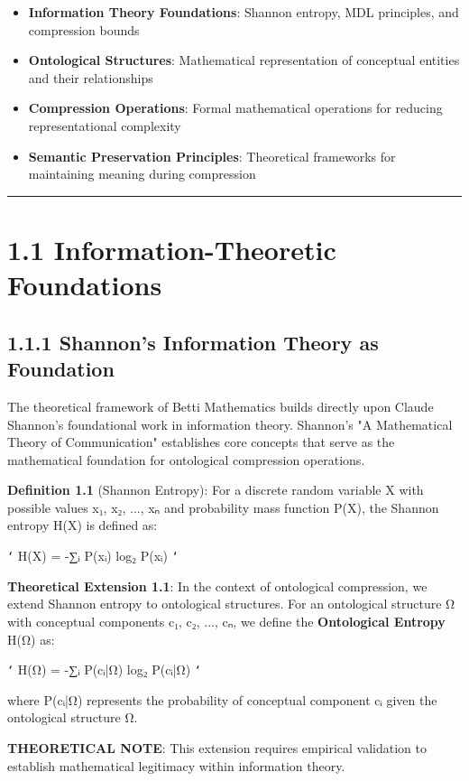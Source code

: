 \begin{itemize}
\item \textbf{Information Theory Foundations}: Shannon entropy, MDL principles, and compression bounds
\item \textbf{Ontological Structures}: Mathematical representation of conceptual entities and their relationships
\item \textbf{Compression Operations}: Formal mathematical operations for reducing representational complexity
\item \textbf{Semantic Preservation Principles}: Theoretical frameworks for maintaining meaning during compression
\end{itemize}

\hrule

\section{1.1 Information-Theoretic Foundations}

\subsection{1.1.1 Shannon's Information Theory as Foundation}

The theoretical framework of Betti Mathematics builds directly upon Claude Shannon's foundational work in information theory. Shannon's "A Mathematical Theory of Communication" establishes core concepts that serve as the mathematical foundation for ontological compression operations.

\textbf{Definition 1.1} (Shannon Entropy): For a discrete random variable X with possible values {x₁, x₂, ..., xₙ} and probability mass function P(X), the Shannon entropy H(X) is defined as:

\texttt{`}
H(X) = -∑ᵢ P(xᵢ) log₂ P(xᵢ)
\texttt{`}

\textbf{Theoretical Extension 1.1}: In the context of ontological compression, we extend Shannon entropy to ontological structures. For an ontological structure Ω with conceptual components {c₁, c₂, ..., cₙ}, we define the \textbf{Ontological Entropy} H(Ω) as:

\texttt{`}
H(Ω) = -∑ᵢ P(cᵢ|Ω) log₂ P(cᵢ|Ω)
\texttt{`}

where P(cᵢ|Ω) represents the probability of conceptual component cᵢ given the ontological structure Ω.

\textbf{THEORETICAL NOTE}: This extension requires empirical validation to establish mathematical legitimacy within information theory.

